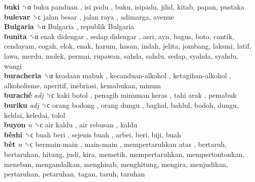 \textbf{buki} ␝α   buku panduan ,  isi padu , buku, isipadu, jilid, kitab, papan, pustaka  \\
\textbf{bulevar} ␝ϲ   jalan besar ,  jalan raya , adimarga, avenue  \\
\textbf{Bulgaria} ␝α   Bulgaria ,  republik Bulgaria   \\
\textbf{bunita} ␝α   enak didengar ,  sedap didengar , asri, ayu, bagus, boto, cantik, cendayam, cogah, elok, enak, harum, hasan, indah, jelita, jombang, laksmi, latif, lawa, merdu, molek, permai, rupawan, sahda, sahdu, sedap, syahda, syahdu, wangi  \\
\textbf{buracheria} ␝α   keadaan mabuk ,  kecanduan-alkohol ,  ketagihan-alkohol , alkoholisme, aperitif, inebriasi, kemabukan, minum  \\
\textbf{buraché} \emph{adj}  ␝ϲ   kaki botol ,  penagih minuman keras ,  tahi arak , pemabuk  \\
\textbf{buriku} \emph{adj}  ␝ϲ   orang bodong ,  orang dungu , baghal, bahlul, bodoh, dungu, keldai, keledai, tolol  \\
\textbf{buyon} \emph{n}  ␝ϲ   air kaldu ,  air rebusan , kaldu  \\
\textbf{bèshi} ␝ϲ   buah beri ,  sejenis buah , arbei, beri, biji, buah  \\
\textbf{bèt} \emph{n}  ␝ϲ   bermain-main ,  main-main ,  mempertaruhkan atas , bertaruh, bertaruhan, hitung, judi, kira, memetik, mempertaruhkan, mempertontonkan, meneban, mengandalkan, menghisab, menghitung, mengira, menjudikan, pertaruhan, petaruhan, tagan, taruh, taruhan  \\
